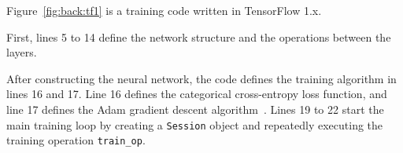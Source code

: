 % 

\begin{inred}
Figure~\ref{fig:back:tf1} is a training code written in TensorFlow 1.x.
\end{inred}
First, lines 5 to 14 define the network structure and the operations
between the layers.
\begin{inred}
After constructing the neural network, the code defines the training algorithm
in lines 16 and 17.
Line 16 defines the categorical cross-entropy loss function,
and line 17 defines the Adam gradient descent algorithm~\cite{kingma2014adam}.
Lines 19 to 22 start the main training loop
by creating a {\tt Session} object and repeatedly executing 
the training operation {\tt train\_op}.



\end{inred}


